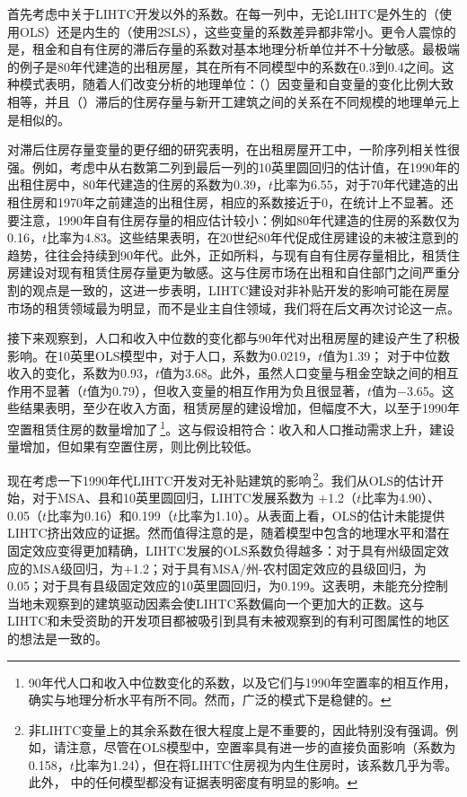 \documentclass[lang=cn,11pt,a4paper]{paper}
\begin{document}
首先考虑中关于LIHTC开发以外的系数。在每一列中，无论LIHTC是外生的（使用OLS）还是内生的（使用2SLS），这些变量的系数差异都非常小。更令人震惊的是，租金和自有住房的滞后存量的系数对基本地理分析单位并不十分敏感。最极端的例子是80年代建造的出租房屋，其在所有不同模型中的系数在0.3到0.4之间。这种模式表明，随着人们改变分析的地理单位：（）因变量和自变量的变化比例大致相等，并且（）滞后的住房存量与新开工建筑之间的关系在不同规模的地理单元上是相似的。

对滞后住房存量变量的更仔细的研究表明，在出租房屋开工中，一阶序列相关性很强。例如，考虑中从右数第二列到最后一列的10英里圆回归的估计值，在1990年的出租住房中，80年代建造的住房的系数为0.39，$t$比率为6.55，对于70年代建造的出租住房和1970年之前建造的出租住房，相应的系数接近于0，在统计上不显著。还要注意，1990年自有住房存量的相应估计较小：例如80年代建造的住房的系数仅为0.16，$t$比率为4.83。这些结果表明，在20世纪80年代促成住房建设的未被注意到的趋势，往往会持续到90年代。此外，正如所料，与现有自有住房存量相比，租赁住房建设对现有租赁住房存量更为敏感。这与住房市场在出租和自住部门之间严重分割的观点是一致的，这进一步表明，LIHTC建设对非补贴开发的影响可能在房屋市场的租赁领域最为明显，而不是业主自住领域，我们将在后文再次讨论这一点。

接下来观察到，人口和收入中位数的变化都与90年代对出租房屋的建设产生了积极影响。在10英里OLS模型中，对于人口，系数为0.0219，$t$值为1.39； 对于中位数收入的变化，系数为0.93，$t$值为3.68。此外，虽然人口变量与租金空缺之间的相互作用不显著（$t$值为0.79），但收入变量的相互作用为负且很显著，$t$值为$-$3.65。这些结果表明，至少在收入方面，租赁房屋的建设增加，但幅度不大，以至于1990年空置租赁住房的数量增加了\,\footnote{90年代人口和收入中位数变化的系数，以及它们与1990年空置率的相互作用，确实与地理分析水平有所不同。然而，广泛的模式下是稳健的。}。这与假设相符合：收入和人口推动需求上升，建设量增加，但如果有空置住房，则比例比较低。

现在考虑一下1990年代LIHTC开发对无补贴建筑的影响\,\footnote{非LIHTC变量上的其余系数在很大程度上是不重要的，因此特别没有强调。例如，请注意，尽管在OLS模型中，空置率具有进一步的直接负面影响（系数为0.158，$t$比率为1.24），但在将LIHTC住房视为内生住房时，该系数几乎为零。此外， 中的任何模型都没有证据表明密度有明显的影响。}。我们从OLS的估计开始，对于MSA、县和10英里圆回归，LIHTC发展系数为 $+$1.2（$t$比率为4.90）、0.05（$t$比率为0.16）和0.199（$t$比率为1.10）。从表面上看，OLS的估计未能提供LIHTC挤出效应的证据。然而值得注意的是，随着模型中包含的地理水平和潜在固定效应变得更加精确，LIHTC发展的OLS系数负得越多：对于具有州级固定效应的MSA级回归，为$+$1.2；对于具有MSA/州-农村固定效应的县级回归，为0.05；对于具有县级固定效应的10英里圆回归，为0.199。这表明，未能充分控制当地未观察到的建筑驱动因素会使LIHTC系数偏向一个更加大的正数。这与LIHTC和未受资助的开发项目都被吸引到具有未被观察到的有利可图属性的地区的想法是一致的。
\end{document}
